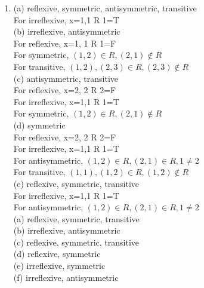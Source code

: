 \documentclass[12pt]{article}
\begin{document}
\begin{enumerate}
\item
{}(a) reflexive, symmetric, antisymmetric, transitive\\
\vspace{0.05in}
For irreflexive, x=1,1 R 1=T\\
(b) irreflexive, antisymmetric\\
For reflexive, x=1, 1 R 1=F\\
For symmetric, $(1,2)\in R, (2,1) \notin R$\\
\vspace{0.05in}
For transitive, $(1,2),(2,3) \in R, (2,3) \notin R$\\
(c) antisymmetric, transitive\\
For reflexive, x=2, 2 R 2=F\\
For irreflexive, x=1,1 R 1=T\\
\vspace{0.05in}
For symmetric, $(1,2)\in R, (2,1) \notin R$\\
(d) symmetric\\
For reflexive, x=2, 2 R 2=F\\
For irreflexive, x=1,1 R 1=T\\
For antisymmetric, $(1,2)\in R, (2,1) \in R,1 \neq 2$\\
\vspace{0.05in}
For transitive, $(1,1),(1,2) \in R, (1,2) \notin R$\\
(e) reflexive, symmetric, transitive\\
For irreflexive, x=1,1 R 1=T\\
\vspace{0.05in}
For antisymmetric, $(1,2)\in R, (2,1) \in R,1 \neq 2$\\
(a) reflexive, symmetric, transitive\\
(b) irreflexive, antisymmetric\\
(c) reflexive, symmetric, transitive\\
(d) reflexive, symmetric\\
(e) irreflexive, symmetric\\
(f) irreflexive, antisymmetric\\

\end{enumerate}
\end{document}
